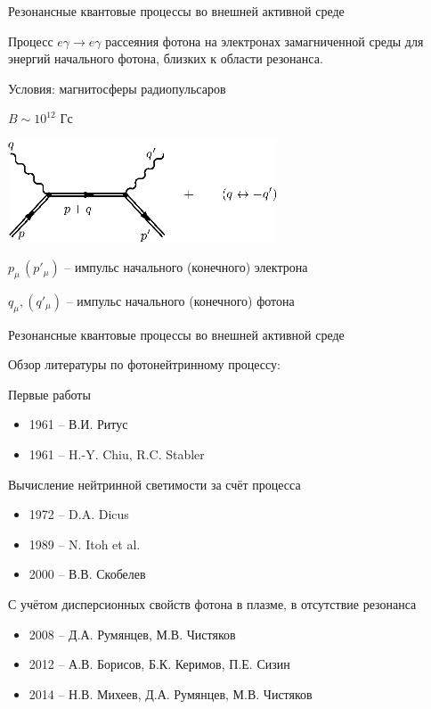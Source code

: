 \documentclass{beamer}
\begin{document}
\begin{frame}{Резонансные квантовые процессы во внешней активной среде}
\begin{center}
Процесс \alert{$e\gamma\to e \gamma$} рассеяния фотона на электронах замагниченной среды 
для энергий начального фотона, близких к области резонанса.

\alert{Условия:} магнитосферы радиопульсаров

$B \sim 10^{12}$ Гс

\includegraphics[width=8cm]{fig2_0.eps}

$p_\mu\, (p'_\mu)$ -- импульс начального (конечного) электрона

$q_\mu, (q'_\mu)$ -- импульс начального (конечного) фотона


\end{center}
\end{frame}
\begin{frame}{Резонансные квантовые процессы во внешней активной среде}
\begin{center}
Обзор литературы по фотонейтринному процессу:
\end{center}
Первые работы
\begin{itemize}
\item 1961 -- В.И. Ритус
\item 1961 -- H.-Y. Chiu, R.C. Stabler
\end{itemize}
Вычисление нейтринной светимости за счёт процесса
\begin{itemize}
\item 1972 -- D.A. Dicus
\item 1989 -- N. Itoh et al.
\item 2000 -- В.В. Скобелев
\end{itemize}
С учётом дисперсионных свойств фотона в плазме, 
в отсутствие резонанса
\begin{itemize}
\item 2008 -- Д.А. Румянцев, М.В. Чистяков
\item 2012 -- А.В. Борисов, Б.К. Керимов, П.Е. Сизин
\item 2014 -- Н.В. Михеев, Д.А. Румянцев, М.В. Чистяков
\end{itemize}
\end{frame}
\end{document}
